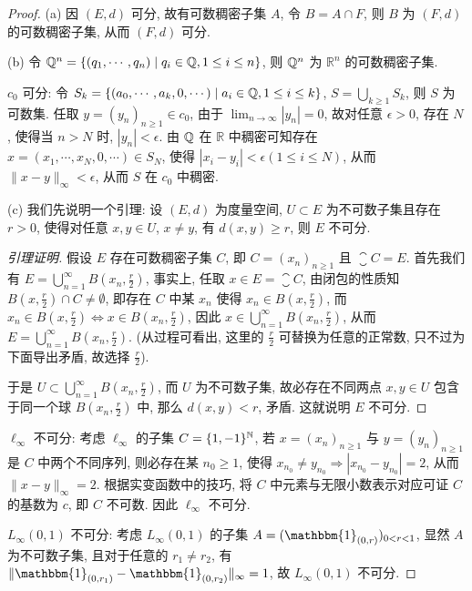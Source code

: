 \begin{proof}
    (a) 因 $(E,d)$ 可分, 故有可数稠密子集 $A$, 令 $B=A\cap F$,
    则 $B$ 为 $(F,d)$ 的可数稠密子集, 从而 $(F,d)$ 可分.

    (b) 令 $\mathbb{Q}^n=\{(q_1,\cdots,q_n)\mid q_i\in\mathbb{Q}, 1\leq i\leq n\}$, 
    则 $\mathbb{Q}^n$ 为 $\mathbb{R}^n$ 的可数稠密子集.

    $c_0$ 可分: 令 $S_k=\{(a_0,\cdots,a_k,0,\cdots)\mid a_i\in\mathbb{Q},1\leq i\leq k\}$,
    $S=\bigcup_{k\geq 1}S_k$, 则 $S$ 为可数集.
    任取 $y=(y_n)_{n\geq 1}\in c_0$, 由于 $\lim_{n\to\infty}|y_n|=0$,
    故对任意 $\epsilon>0$, 存在 $N$, 使得当 $n>N$ 时, $|y_n|<\epsilon$.
    由 $\mathbb{Q}$ 在 $\mathbb{R}$ 中稠密可知存在 $x=(x_1,\cdots,x_N,0,\cdots)\in S_N$,
    使得 $|x_i-y_i|<\epsilon(1\leq i\leq N)$, 从而 $\|x-y\|_{\infty}<\epsilon$,
    从而 $S$ 在 $c_0$ 中稠密.

    (c) 我们先说明一个引理:
    设 $(E,d)$ 为度量空间, $U\subset E$ 为不可数子集且存在 $r>0$,
    使得对任意 $x,y\in U$, $x\neq y$, 有 $d(x,y)\geq r$,
    则 $E$ 不可分.
    \begin{proof}[引理证明]
        假设 $E$ 存在可数稠密子集 $C$, 即 $C=(x_n)_{n\geq 1}$ 且 $\closure{C}=E$.
        首先我们有 $E=\bigcup_{n=1}^{\infty}B(x_n,\frac{r}{2})$,
        事实上, 任取 $x\in E=\closure{C}$, 由闭包的性质知 $B(x,\frac{r}{2})\cap C\neq\emptyset$,
        即存在 $C$ 中某 $x_n$ 使得 $x_n\in B(x,\frac{r}{2})$,
        而 $x_n\in B(x,\frac{r}{2})\Leftrightarrow x\in B(x_n,\frac{r}{2})$, 因此
        $x\in\bigcup_{n=1}^{\infty}B(x_n,\frac{r}{2})$, 从而 $E=\bigcup_{n=1}^{\infty}B(x_n,\frac{r}{2})$. 
        (从过程可看出, 这里的 $\frac{r}{2}$ 可替换为任意的正常数, 只不过为下面导出矛盾,
        故选择 $\frac{r}{2}$).

        于是 $U\subset\bigcup_{n=1}^{\infty}B(x_n,\frac{r}{2})$,
        而 $U$ 为不可数子集, 故必存在不同两点 $x,y\in U$ 包含于同一个球 $B(x_n,\frac{r}{2})$ 中,
        那么 $d(x,y)<r$, 矛盾. 这就说明 $E$ 不可分.
    \end{proof}
    
    $\ell_{\infty}$ 不可分: 考虑 $\ell_{\infty}$ 的子集 $C=\{1,-1\}^{\mathbb{N}}$, 
    若 $x=(x_n)_{n\geq 1}$ 与 $y=(y_n)_{n\geq 1}$ 是 $C$ 中两个不同序列, 
    则必存在某 $n_0\geq 1$, 使得 $x_{n_0}\neq y_{n_0}\Rightarrow |x_{n_0}-y_{n_0}|=2$,
    从而 $\|x-y\|_{\infty}=2$. 根据实变函数中的技巧, 将 $C$ 中元素与无限小数表示对应可证
    $C$ 的基数为 $c$, 即 $C$ 不可数. 因此 $\ell_{\infty}$ 不可分.

    $L_{\infty}(0,1)$ 不可分: 考虑 $L_{\infty}(0,1)$ 的子集
    $A=(\mathbbm{1}_{(0,r)})_{0<r<1}$, 显然 $A$ 为不可数子集,
    且对于任意的 $r_1\neq r_2$, 有 $\|\mathbbm{1}_{(0,r_1)}-\mathbbm{1}_{(0,r_2)}\|_{\infty}=1$,
    故 $L_{\infty}(0,1)$ 不可分. 
\end{proof}




